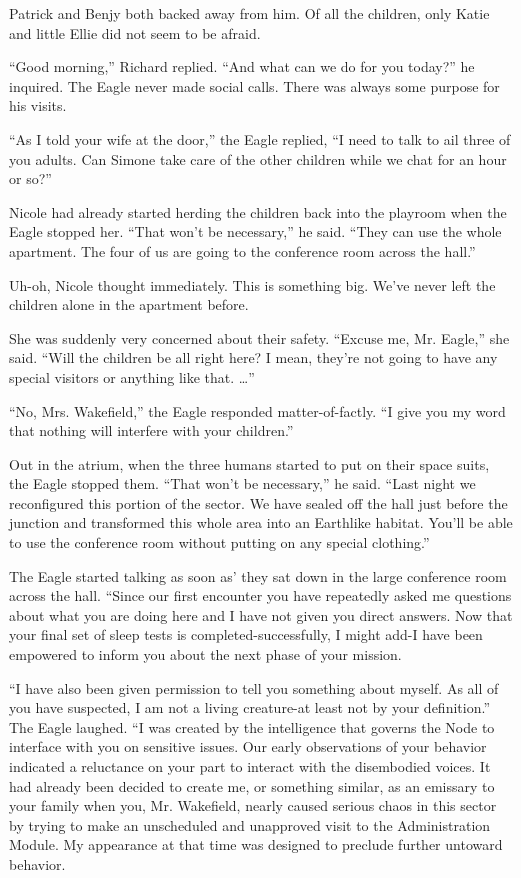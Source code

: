 \documentclass[]{article}
\begin{document}
{Patrick and Benjy both backed away from him. Of all the children, only Katie and little Ellie did not seem to be afraid.

“Good morning,” Richard replied. “And what can we do for you today?” he inquired. The Eagle never made social calls. There was always some purpose for his visits.

“As I told your wife at the door,” the Eagle replied, “I need to talk to ail three of you adults. Can Simone take care of the other children while we chat for an hour or so?”

Nicole had already started herding the children back into the playroom when the Eagle stopped her. “That won’t be necessary,” he said. “They can use the whole apartment. The four of us are going to the conference room across the hall.”

Uh-oh, Nicole thought immediately. This is something big. We’ve never left the children alone in the apartment before.

She was suddenly very concerned about their safety. “Excuse me, Mr. Eagle,” she said. “Will the children be all right here? I mean, they’re not going to have any special visitors or anything like that. …”

“No, Mrs. Wakefield,” the Eagle responded matter-of-factly. “I give you my word that nothing will interfere with your children.”

Out in the atrium, when the three humans started to put on their space suits, the Eagle stopped them. “That won’t be necessary,” he said. “Last night we reconfigured this portion of the sector. We have sealed off the hall just before the junction and transformed this whole area into an Earthlike habitat. You’ll be able to use the conference room without putting on any special clothing.”

The Eagle started talking as soon as’ they sat down in the large conference room across the hall. “Since our first encounter you have repeatedly asked me questions about what you are doing here and I have not given you direct answers. Now that your final set of sleep tests is completed-successfully, I might add-I have been empowered to inform you about the next phase of your mission.

“I have also been given permission to tell you something about myself. As all of you have suspected, I am not a living creature-at least not by your definition.” The Eagle laughed. “I was created by the intelligence that governs the Node to interface with you on sensitive issues. Our early observations of your behavior indicated a reluctance on your part to interact with the disembodied voices. It had already been decided to create me, or something similar, as an emissary to your family when you, Mr. Wakefield, nearly caused serious chaos in this sector by trying to make an unscheduled and unapproved visit to the Administration Module. My appearance at that time was designed to preclude further untoward behavior.

}
\end{document}
